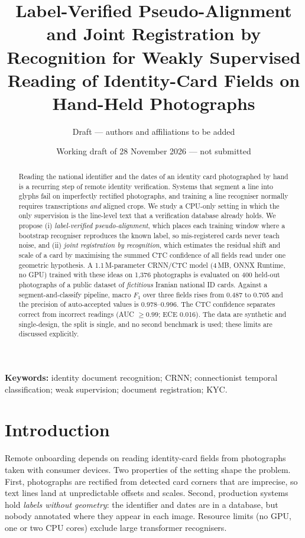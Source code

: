 \documentclass[11pt,a4paper]{article}
\title{Label-Verified Pseudo-Alignment and Joint Registration by Recognition for Weakly Supervised Reading of Identity-Card Fields on Hand-Held Photographs}
\author{Draft --- authors and affiliations to be added}
\date{Working draft of 28 November 2026 --- not submitted}
\newcommand{\Fone}{F_1}
\begin{document}
\maketitle

\begin{abstract}
Reading the national identifier and the dates of an identity card photographed by hand is a recurring step of remote identity verification. Systems that segment a line into glyphs fail on imperfectly rectified photographs, and training a line recogniser normally requires transcriptions \emph{and} aligned crops. We study a CPU-only setting in which the only supervision is the line-level text that a verification database already holds. We propose (i) \emph{label-verified pseudo-alignment}, which places each training window where a bootstrap recogniser reproduces the known label, so mis-registered cards never teach noise, and (ii) \emph{joint registration by recognition}, which estimates the residual shift and scale of a card by maximising the summed CTC confidence of all fields read under one geometric hypothesis. A 1.1\,M-parameter CRNN/CTC model (4\,MB, ONNX Runtime, no GPU) trained with these ideas on 1{,}376 photographs is evaluated on 400 held-out photographs of a public dataset of \emph{fictitious} Iranian national ID cards. Against a segment-and-classify pipeline, macro $\Fone$ over three fields rises from 0.487 to 0.705 and the precision of auto-accepted values is 0.978--0.996. The CTC confidence separates correct from incorrect readings (AUC $\ge 0.99$; ECE 0.016). The data are synthetic and single-design, the split is single, and no second benchmark is used; these limits are discussed explicitly.
\end{abstract}

\noindent\textbf{Keywords:} identity document recognition; CRNN; connectionist temporal classification; weak supervision; document registration; KYC.

\section{Introduction}
Remote onboarding depends on reading identity-card fields from photographs taken with consumer devices. Two properties of the setting shape the problem. First, photographs are rectified from detected card corners that are imprecise, so text lines land at unpredictable offsets and scales. Second, production systems hold \emph{labels without geometry}: the identifier and dates are in a database, but nobody annotated where they appear in each image. Resource limits (no GPU, one or two CPU cores) exclude large transformer recognisers.
\end{document}
